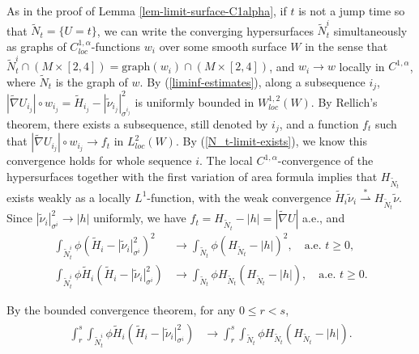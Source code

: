 \documentclass[11pt, letterpaper]{amsart}
\theoremstyle{definition}
\theoremstyle{remark}
\def\WL{\overset{\ast}{\rightharpoonup}}
\begin{document}
As in the proof of Lemma \ref{lem-limit-surface-C1alpha}, if $t$ is not a jump time so that $\tilde{N}_t = \{U=t\} $,  we can write the converging hypersurfaces $\tilde{N}^{i}_t$ simultaneously as graphs of $C^{1,\alpha }_{loc}$-functions $w_i$ over some smooth surface $W $ in the sense that $\tilde{N}^{i}_{t} \cap (M \times [2,4]) = \mathrm{graph}(w_i) \cap (M \times [2,4])$, and $w_i \to w$ locally in $C^{1,\alpha }$, where $\tilde{N}_{t}$ is the graph of $w$. 
By (\ref{liminf-estimates}), along a subsequence $i_j$, $|\tilde{\nabla }U_{i_j}|\circ w_{i_j} = \tilde{H}_{i_j} - |\tilde{\nu }_{i_j}|^2_{\sigma ^{i_j}}$ is uniformly bounded in $W^{1,2}_{loc}(W)$. By Rellich's theorem, there exists a subsequence, still denoted by $i_j$, and a function $f_t$ such that $|\tilde{\nabla }U_{i_j}|\circ w_{i_j} \to f_t$ in $L^2_{loc}(W)$. By (\ref{N_t-limit-exists}), we know this convergence holds for whole sequence $i$. The local $C^{1,\alpha }$-convergence of the hypersurfaces together with the first variation of area formula implies that $H_{\tilde{N}_t}$ exists weakly as a locally $L^{1}$-function, with the weak convergence $\tilde{H}_{i} \tilde{\nu }_{i} \WL H_{\tilde{N}_t} \tilde{\nu }$. Since $|\tilde{\nu }_{i}|^2_{\sigma ^{i}} \to |h|$ uniformly, we have $f_t = H_{\tilde{N}_t} - |h| = |\tilde{\nabla }U|$ a.e., and
\begin{align*}
	\int_{\tilde{N}^{i}_t} \phi (\tilde{H}_{i} - |\tilde{\nu }_{i}|^2_{\sigma ^{i}})^2 &\to \int_{\tilde{N}_t} \phi (H_{\tilde{N}_t} - |h|)^2,\quad \text{a.e. } t \geq 0,\\
	\int_{\tilde{N}^{i}_t} \phi \tilde{H}_i (\tilde{H}_i - |\tilde{\nu }_i|^2_{\sigma ^{i}}) &\to \int_{\tilde{N}_t} \phi H_{\tilde{N}_t}(H_{\tilde{N}_t} - |h|),\quad \text{a.e. } t \geq 0.
\end{align*}

By the bounded convergence theorem, for any $0\leq r< s$,
\begin{align}
	\begin{split}
		\int_{r}^{s}  \int_{\tilde{N}^{i}_t} \phi \tilde{H}_{i}(\tilde{H}_{i} - |\tilde{\nu }_{i}|^2_{\sigma ^{i}}) &\to \int_{r}^{s} \int_{\tilde{N}_t} \phi H_{\tilde{N}_t}(H_{\tilde{N}_t} - |h|).
	\end{split}
\end{align}
\end{document}
